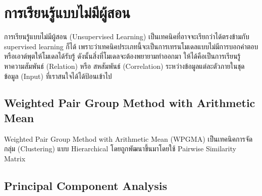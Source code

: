 

\chapter{การเรียนรู้แบบไม่มีผู้สอน}
\label{ch:unsup_ml}

การเรียนรู้แบบไม่มีผู้สอน (Unsupervised Learning) เป็นเทคนิคที่อาจจะเรียกว่าได้ตรงข้ามกับ supervised learning ก็ได้
เพราะว่าเทคนิคประเภทนี้จะเป็นการเทรนโมเดลแบบไม่มีการบอกคำตอบหรือเอาต์พุตให้โมเดลได้รับรู้ ดังนั้นสิ่งที่โมเดลจะต้องพยายามทำออกมา
ให้ได้คือเป็นการเรียนรู้หาความสัมพันธ์ (Relation) หรือ สหสัมพันธ์ (Correlation) ระหว่างข้อมูลแต่ละตัวภายในชุดข้อมูล (Input) 
ที่เราสนใจได้ได้ป้อนเข้าไป

\section{Weighted Pair Group Method with Arithmetic Mean}

Weighted Pair Group Method with Arithmetic Mean (WPGMA) เป็นเทคนิคการจัดกลุ่ม (Clustering) แบบ Hierarchical 
โดยถูกพัฒนาขึ้นมาโดยใช้ Pairwise Similarity Matrix\cite{sokal1958} 

\section{Principal Component Analysis}


